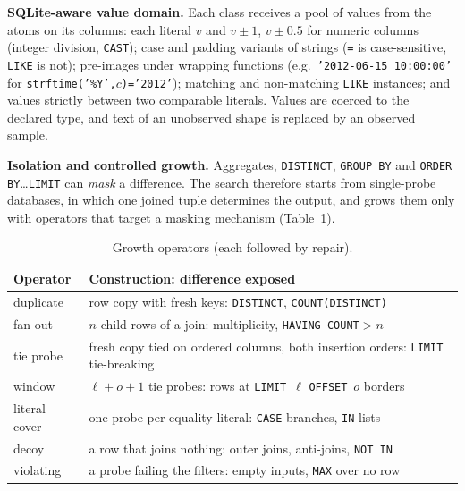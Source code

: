\textbf{SQLite-aware value domain.} Each class receives a pool of values from the atoms on its columns: each literal $v$ and $v\pm1$, $v\pm0.5$ for numeric columns (integer division, \texttt{CAST}); case and padding variants of strings (\texttt{=} is case-sensitive, \texttt{LIKE} is not); pre-images under wrapping functions (e.g.\ \texttt{'2012-06-15 10:00:00'} for \texttt{strftime('\%Y',$c$)='2012'}); matching and non-matching \texttt{LIKE} instances; and values strictly between two comparable literals. Values are coerced to the declared type, and text of an unobserved shape is replaced by an observed sample.

\textbf{Isolation and controlled growth.} Aggregates, \texttt{DISTINCT}, \texttt{GROUP BY} and \texttt{ORDER BY}\dots\texttt{LIMIT} can \emph{mask} a difference. The search therefore starts from single-probe databases, in which one joined tuple determines the output, and grows them only with operators that target a masking mechanism (Table~\ref{tab:operators}).

\begin{table}[t]
\centering\footnotesize
\caption{Growth operators (each followed by repair).}\label{tab:operators}
\begin{tabularx}{\linewidth}{@{}l>{\raggedright\arraybackslash}X@{}}
\toprule
Operator & Construction: difference exposed\\
\midrule
duplicate & row copy with fresh keys: \texttt{DISTINCT}, \texttt{COUNT(DISTINCT)}\\
fan-out & $n$ child rows of a join: multiplicity, \texttt{HAVING COUNT}$>n$\\
tie probe & fresh copy tied on ordered columns, both insertion orders: \texttt{LIMIT} tie-breaking\\
window & $\ell{+}o{+}1$ tie probes: rows at \texttt{LIMIT}~$\ell$ \texttt{OFFSET}~$o$ borders\\
literal cover & one probe per equality literal: \texttt{CASE} branches, \texttt{IN} lists\\
decoy & a row that joins nothing: outer joins, anti-joins, \texttt{NOT IN}\\
violating & a probe failing the filters: empty inputs, \texttt{MAX} over no row\\
\bottomrule
\end{tabularx}
\end{table}

